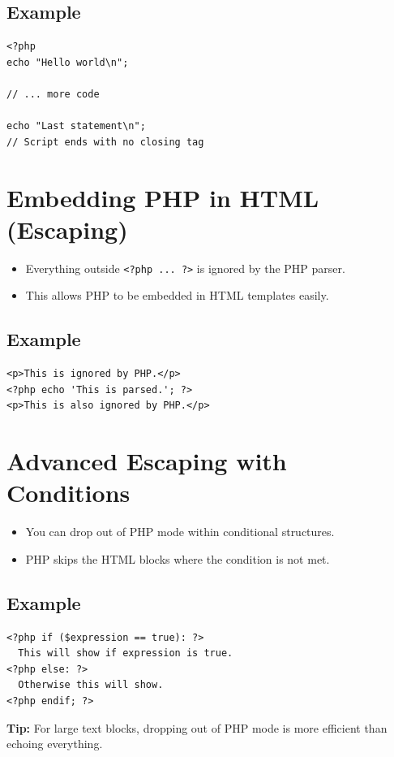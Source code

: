 \documentclass[12pt,a4paper]{article}
\begin{document}
\subsection*{Example}
\begin{verbatim}
<?php
echo "Hello world\n";

// ... more code

echo "Last statement\n";
// Script ends with no closing tag
\end{verbatim}

\section{Embedding PHP in HTML (Escaping)}
\begin{itemize}[left=1em]
  \item Everything outside \verb|<?php ... ?>| is ignored by the PHP parser.
  \item This allows PHP to be embedded in HTML templates easily.
\end{itemize}

\subsection*{Example}
\begin{verbatim}
<p>This is ignored by PHP.</p>
<?php echo 'This is parsed.'; ?>
<p>This is also ignored by PHP.</p>
\end{verbatim}

\section{Advanced Escaping with Conditions}
\begin{itemize}[left=1em]
  \item You can drop out of PHP mode within conditional structures.
  \item PHP skips the HTML blocks where the condition is not met.
\end{itemize}

\subsection*{Example}
\begin{verbatim}
<?php if ($expression == true): ?>
  This will show if expression is true.
<?php else: ?>
  Otherwise this will show.
<?php endif; ?>
\end{verbatim}

\textbf{Tip:} For large text blocks, dropping out of PHP mode is more efficient than echoing everything.
\end{document}
